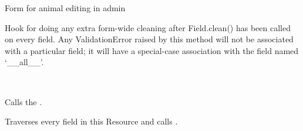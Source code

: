 \documentclass[letterpaper,10pt,openany,oneside,english]{sphinxmanual}
\begin{document}
\begin{fulllineitems}
\label{\detokenize{index:animals.admin.AnimalForm}}
Form for animal editing in admin

\begin{fulllineitems}
\label{\detokenize{index:animals.admin.AnimalForm.clean}}
Hook for doing any extra form-wide cleaning after Field.clean() has been
called on every field. Any ValidationError raised by this method will
not be associated with a particular field; it will have a special-case
association with the field named ‘\_\_all\_\_’.

\end{fulllineitems}


\end{fulllineitems}


\begin{fulllineitems}
\label{\detokenize{index:animals.admin.AnimalResource}}~

\begin{fulllineitems}
\label{\detokenize{index:animals.admin.AnimalResource.get_instance}}
Calls the .

\end{fulllineitems}


\begin{fulllineitems}
\label{\detokenize{index:animals.admin.AnimalResource.import_obj}}
Traverses every field in this Resource and calls
.

\end{fulllineitems}


\end{fulllineitems}
\end{document}
